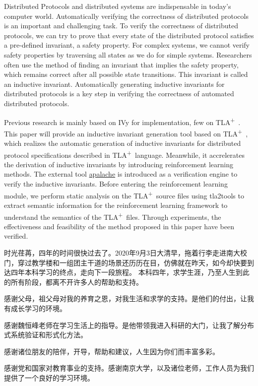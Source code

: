 \documentclass[
    type = bachelor,
    degree = academic,
    twoside,
    fontset = win,
    decl-page
]
{njuthesis}
\newcommand{\TLA}{TLA\textsuperscript{+}\ }
\begin{document}
\begin{abstract*}
    Distributed Protocols and distributed systems are indispensable in today's computer world. Automatically verifying the correctness of distributed protocols is an important and challenging task.
    To verify the correctness of distributed protocols, we can try to prove that every state of the distributed protocol satisfies a pre-defined invariant, a safety property.
    For complex systems, we cannot verify safety properties by traversing all states as we do for simple systems.
    Researchers often use the method of finding an invariant that implies the safety property, which remains correct after all possible state transitions. This invariant is called an inductive invariant.
    Automatically generating inductive invariants for distributed protocols is a key step in verifying the correctness of automated distributed protocols.

    Previous research is mainly based on IVy for implementation, few on \TLA. 
    This paper will provide an inductive invariant generation tool based on \TLA, which realizes the automatic generation of inductive invariants for distributed protocol specifications described in \TLA language.
    Meanwhile, it accrelerates the derivation of inductive invariants by introducing reinforcement learning methods.
    The external tool \href{https://apalache.informal.systems/}{apalache} is introduced as a verification engine to verify the inductive invariants.
    Before entering the reinforcement learning module, we perform static analysis on the \TLA source files using tla2tools to extract semantic information for the reinforcement learning framework to understand the semantics of the \TLA files.
    Through experiments, the effectiveness and feasibility of the method proposed in this paper have been verified.
\end{abstract*}

\tableofcontents

\mainmatter






\printbibliography

\begin{acknowledgement}
    时光荏苒，四年的时间很快过去了。2020年9月3日大清早，拖着行李走进南大校门，穿过教学楼和一组团主干道的场景还历历在目，仿佛就在昨天，如今却快要到达四年本科学习的终点，走向下一段旅程。
    本科四年，求学生涯，乃至人生到此的所有阶段，都离不开许多人的帮助和支持。

    感谢父母，祖父母对我的养育之恩，对我生活和求学的支持。是他们的付出，让我有成长学习的环境。

    感谢魏恒峰老师在学习生活上的指导。是他带领我进入科研的大门，让我了解分布式系统验证和形式化方法。

    感谢诸位朋友的陪伴，开导，帮助和建议，人生因为你们而丰富多彩。

    感谢党和国家对教育事业的支持。感谢南京大学，以及诸位老师，工作人员为我们提供了一个良好的学习环境。

\end{acknowledgement}
\end{document}
